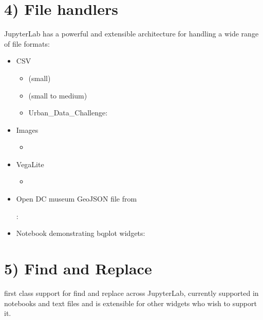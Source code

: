 \documentclass[letterpaper,10pt,english]{sphinxmanual}
\begin{document}
\section{4) File handlers}
\label{\detokenize{markdown:file-handlers}}
JupyterLab has a powerful and extensible architecture for handling a wide range of file formats:
\begin{itemize}
\item {} 
CSV
\begin{itemize}
\item {} 
 (small)

\item {} 
 (small to medium)

\item {} 
Urban\_Data\_Challenge: 

\end{itemize}

\item {} 
Images
\begin{itemize}
\item {} 

\end{itemize}

\item {} 
Vega\sphinxhyphen{}Lite
\begin{itemize}
\item {} 

\end{itemize}

\item {} 
Open DC museum GeoJSON file from %
\begin{footnote}[10]\sphinxAtStartFootnote
{}
%
\end{footnote}: 

\item {} 
Notebook demonstrating bqplot widgets: 

\end{itemize}


\section{5) Find and Replace}
\label{\detokenize{markdown:find-and-replace}}
first class support for find and replace across JupyterLab, currently supported in
notebooks and text files and is extensible for other widgets who wish to support it.
\end{document}
